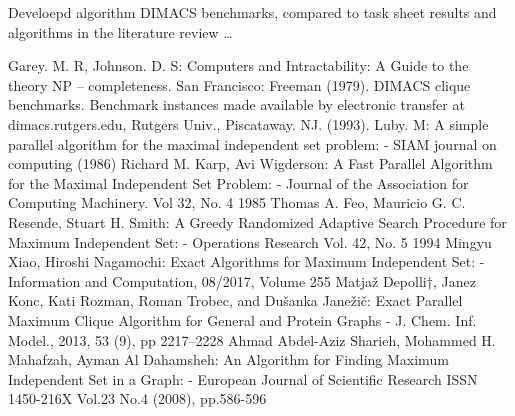 \documentclass[conference]{IEEEtran}
\begin{document}
Develoepd algorithm DIMACS benchmarks, compared to task sheet results and algorithms in the literature review \dots

\begin{thebibliography}{00}
 Garey. M. R, Johnson. D. S: Computers and Intractability: A Guide to the theory NP – completeness. San Francisco: Freeman (1979).  
 DIMACS clique benchmarks. Benchmark instances made available by electronic transfer at dimacs.rutgers.edu, Rutgers Univ., Piscataway. NJ. (1993). 
 Luby. M: A simple parallel algorithm for the maximal independent set problem: - SIAM journal on computing (1986)
 Richard M. Karp, Avi Wigderson: A Fast Parallel Algorithm for the Maximal Independent Set Problem: - Journal of the Association for Computing Machinery. Vol 32, No. 4 1985
 Thomas A. Feo, Mauricio G. C. Resende, Stuart H. Smith: A Greedy Randomized Adaptive Search Procedure for Maximum Independent Set: - Operations Research Vol. 42, No. 5 1994
 Mingyu Xiao, Hiroshi Nagamochi: Exact Algorithms for Maximum Independent Set: - Information and Computation, 08/2017, Volume 255
 Matjaž Depolli†, Janez Konc, Kati Rozman, Roman Trobec, and Dušanka Janežič: Exact Parallel Maximum Clique Algorithm for General and Protein Graphs - J. Chem. Inf. Model., 2013, 53 (9), pp 2217–2228
 Ahmad Abdel-Aziz Sharieh, Mohammed H. Mahafzah, Ayman Al Dahamsheh: An Algorithm for Finding Maximum Independent Set in a Graph: - European Journal of Scientific Research ISSN 1450-216X Vol.23 No.4 (2008), pp.586-596
\end{thebibliography}
\end{document}
